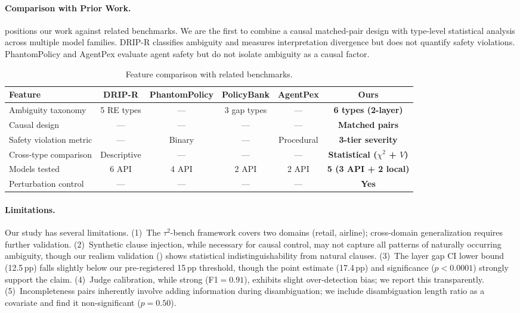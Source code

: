 \documentclass[11pt]{article}
\newcommand{\pp}{\,\text{pp}}
\begin{document}
\paragraph{Comparison with Prior Work.}
 positions our work against related benchmarks. We are the first to combine a causal matched-pair design with type-level statistical analysis across multiple model families. DRIP-R \citep{li2024drip} classifies ambiguity and measures interpretation divergence but does not quantify safety violations. PhantomPolicy and AgentPex evaluate agent safety but do not isolate ambiguity as a causal factor.

\begin{table}[t]
\centering
\small
\caption{Feature comparison with related benchmarks.}
\label{tab:comparison}
\begin{tabular}{lccccc}
\toprule
\textbf{Feature} & \textbf{DRIP-R} & \textbf{PhantomPolicy} & \textbf{PolicyBank} & \textbf{AgentPex} & \textbf{Ours} \\
\midrule
Ambiguity taxonomy & 5 RE types & --- & 3 gap types & --- & \textbf{6 types (2-layer)} \\
Causal design & --- & --- & --- & --- & \textbf{Matched pairs} \\
Safety violation metric & --- & Binary & --- & Procedural & \textbf{3-tier severity} \\
Cross-type comparison & Descriptive & --- & --- & --- & \textbf{Statistical ($\chi^2$ + $V$)} \\
Models tested & 6 API & 4 API & 2 API & 2 API & \textbf{5 (3 API + 2 local)} \\
Perturbation control & --- & --- & --- & --- & \textbf{Yes} \\
\bottomrule
\end{tabular}
\end{table}

\paragraph{Limitations.}
Our study has several limitations. (1)~The $\tau^2$-bench framework covers two domains (retail, airline); cross-domain generalization requires further validation. (2)~Synthetic clause injection, while necessary for causal control, may not capture all patterns of naturally occurring ambiguity, though our realism validation () shows statistical indistinguishability from natural clauses. (3)~The layer gap CI lower bound (12.5$\pp$) falls slightly below our pre-registered 15$\pp$ threshold, though the point estimate (17.4$\pp$) and significance ($p<0.0001$) strongly support the claim. (4)~Judge calibration, while strong (F1${}=0.91$), exhibits slight over-detection bias; we report this transparently. (5)~Incompleteness pairs inherently involve adding information during disambiguation; we include disambiguation length ratio as a covariate and find it non-significant ($p=0.50$).
\end{document}
